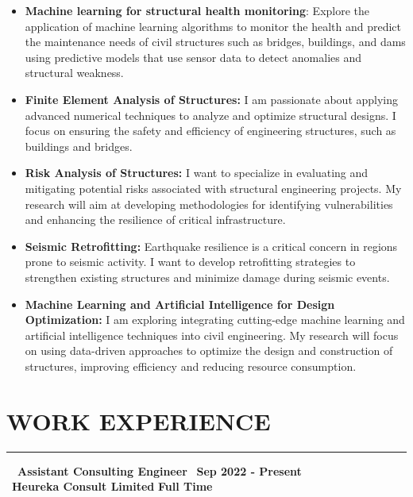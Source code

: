 \documentclass[letterpaper, 12pt]{article}
\newcommand{\cvsection}[1]{

	\section*{#1} \vspace*{-0.8cm}%
	\rule{\linewidth}{1.5pt}\par
}
\newcommand{\verticalSpace}{4pt}
\begin{document}
\begin{itemize}[leftmargin=*]

	\item \textbf{Machine learning for structural health monitoring}: Explore the application of machine
	      learning algorithms to monitor the health and predict the maintenance needs of civil structures
	      such as bridges, buildings, and dams using predictive models that use sensor data to detect
	      anomalies and structural weakness.

	\item \textbf{Finite Element Analysis of Structures:} I am passionate about applying advanced numerical
	      techniques to analyze and optimize structural designs. I focus on ensuring the safety and efficiency
	      of engineering structures, such as buildings and bridges.

	\item \textbf{Risk Analysis of Structures:} I want to specialize in evaluating and mitigating potential
	      risks associated with structural engineering projects. My research will aim at developing methodologies
	      for identifying vulnerabilities and enhancing the resilience of critical infrastructure.

	\item \textbf{Seismic Retrofitting:} Earthquake resilience is a critical concern in regions prone to seismic
	      activity. I want to develop retrofitting strategies to strengthen existing structures and minimize
	      damage during seismic events.

	\item \textbf{Machine Learning and Artificial Intelligence for Design Optimization:} I am exploring integrating
	      cutting-edge machine learning and artificial intelligence techniques into civil engineering. My research
	      will focus on using data-driven approaches to optimize the design and construction of structures, improving
	      efficiency and reducing resource consumption.

\end{itemize}


\cvsection{WORK EXPERIENCE}

\faUser \, \, \textbf{Assistant Consulting Engineer} \hfill \faCalendar \, \textbf{Sep 2022 - Present} \\ [\verticalSpace]
\faInstitution \, \textbf{Heureka Consult Limited} \hfill \textbf{Full Time}
\end{document}
